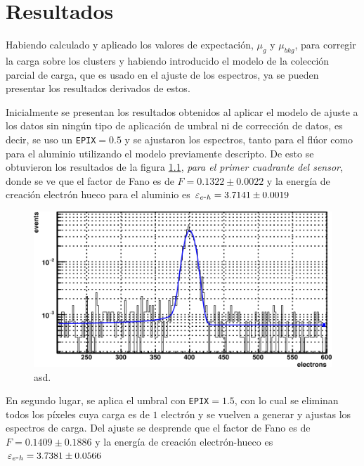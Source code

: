 \chapter{Resultados \label{chap:Resultados}}
\noindent Habiendo calculado y aplicado los valores de expectación, $\mu_{g}$ y $\mu_{bkg}$, para corregir la carga sobre los clusters y habiendo introducido el modelo de la colección parcial de carga, que es usado en el ajuste de los espectros, ya se pueden presentar los resultados derivados de estos.

Inicialmente se presentan los resultados obtenidos al aplicar el modelo de ajuste a los datos sin ningún tipo de aplicación de umbral ni de corrección de datos, es decir, se uso un \verb|EPIX|$=0.5$ y se ajustaron los espectros, tanto para el flúor como para el aluminio utilizando el modelo previamente descripto. De esto se obtuvieron los resultados de la figura \ref{fig:OHDU1_EPIX05}, \textit{para el primer cuadrante del sensor}, donde se ve que el factor de Fano es de $F = 0.1322 \pm 0.0022$ y la energía de creación electrón hueco para el aluminio es $\varepsilon_{e\mbox{-}h} = 3.7141 \pm 0.0019$
\begin{figure}[H]
    \centering
        \includegraphics[scale=1]{pngs/OHDU1_EPIX05.png}
    \caption{\footnotesize{asd.}}
    \label{fig:OHDU1_EPIX05}
\end{figure}
En segundo lugar, se aplica el umbral con \verb|EPIX|$=1.5$, con lo cual se eliminan todos los píxeles cuya carga es de $1$ electrón y se vuelven a generar y ajustas los espectros de carga. Del ajuste se desprende que el factor de Fano es de $F = 0.1409 \pm 0.1886$ y la energía de creación electrón-hueco es $\varepsilon_{e\mbox{-}h} = 3.7381 \pm 0.0566$
